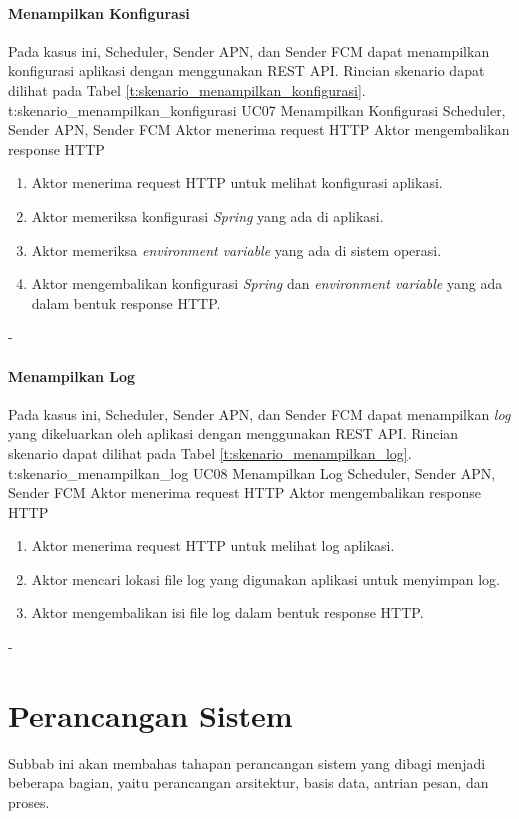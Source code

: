 \paragraph{Menampilkan Konfigurasi}
\par Pada kasus ini, Scheduler, Sender APN, dan Sender FCM dapat menampilkan konfigurasi aplikasi dengan menggunakan REST API. Rincian skenario dapat dilihat pada Tabel \ref{t:skenario_menampilkan_konfigurasi}.
\tableUcDesc
{t:skenario_menampilkan_konfigurasi}
{UC07}
{Menampilkan Konfigurasi}
{Scheduler, Sender APN, Sender FCM}
{Aktor menerima request HTTP}
{Aktor mengembalikan response HTTP}
{
	\begin{enumerate}
		\item Aktor menerima request HTTP untuk melihat konfigurasi aplikasi.
		\item Aktor memeriksa konfigurasi \textit{Spring} yang ada di aplikasi.
		\item Aktor memeriksa \textit{environment variable} yang ada di sistem operasi.
		\item Aktor mengembalikan konfigurasi \textit{Spring} dan \textit{environment variable} yang ada dalam bentuk response HTTP.
	\end{enumerate}
}
{-}

\paragraph{Menampilkan Log}
\par Pada kasus ini, Scheduler, Sender APN, dan Sender FCM dapat menampilkan \textit{log} yang dikeluarkan oleh aplikasi dengan menggunakan REST API. Rincian skenario dapat dilihat pada Tabel \ref{t:skenario_menampilkan_log}.
\tableUcDesc
{t:skenario_menampilkan_log}
{UC08}
{Menampilkan Log}
{Scheduler, Sender APN, Sender FCM}
{Aktor menerima request HTTP}
{Aktor mengembalikan response HTTP}
{
\begin{enumerate}
	\item Aktor menerima request HTTP untuk melihat log aplikasi.
	\item Aktor mencari lokasi file log yang digunakan aplikasi untuk menyimpan log.
	\item Aktor mengembalikan isi file log dalam bentuk response HTTP.
\end{enumerate}
}
{-}

\section{Perancangan Sistem}
\par Subbab ini akan membahas tahapan perancangan sistem yang dibagi menjadi beberapa bagian, yaitu perancangan
arsitektur, basis data, antrian pesan, dan proses.

